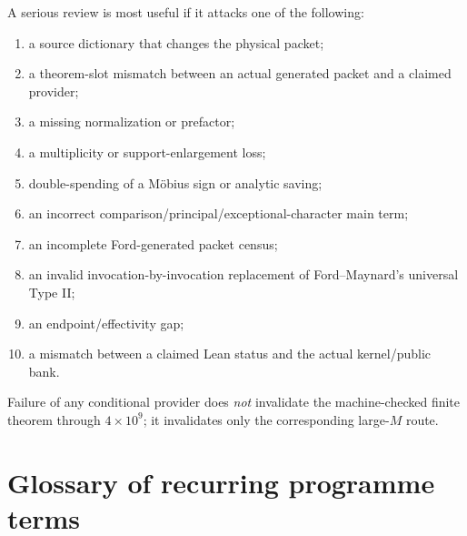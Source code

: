 \documentclass[11pt]{article}
\theoremstyle{definition}
\newcommand{\1}{\mathbf 1}
\begin{document}
A serious review is most useful if it attacks one of the following:
\begin{enumerate}[leftmargin=2.0em]
\item a source dictionary that changes the physical packet;
\item a theorem-slot mismatch between an actual generated packet and a claimed provider;
\item a missing normalization or prefactor;
\item a multiplicity or support-enlargement loss;
\item double-spending of a M\"obius sign or analytic saving;
\item an incorrect comparison/principal/exceptional-character main term;
\item an incomplete Ford-generated packet census;
\item an invalid invocation-by-invocation replacement of Ford--Maynard's universal Type II;
\item an endpoint/effectivity gap;
\item a mismatch between a claimed Lean status and the actual kernel/public bank.
\end{enumerate}
Failure of any conditional provider does \emph{not} invalidate the machine-checked finite
theorem through $4\times10^9$; it invalidates only the corresponding large-$M$ route.

\section{Glossary of recurring programme terms}
\label{sec:glossary}
\end{document}
